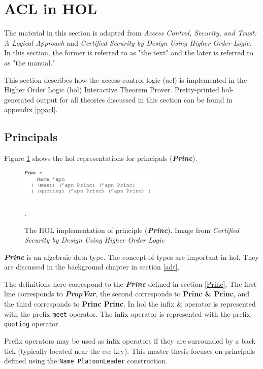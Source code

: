 \documentclass[../../main/main.tex]{subfiles}
\begin{document}
\section{ACL in HOL} \label{sec:aclinhol}
The material in this section is adapted from \textit{Access Control, Security, and Trust: A Logical Approach}\cite{ChinOlder} and \textit{Certified Security by Design Using Higher Order Logic}\cite{certmanual}. In this section, the former is referred to as "the text" and the later is referred to as "the manual."  


This section describes how the access-control logic (\gls{acl}) is implemented in the Higher Order Logic (\gls{hol}) Interactive Theorem Prover.  Pretty-printed \gls{hol}-generated output for all theories discussed in this section can be found in appendix \ref{ppacl}.  


\subsection{Principals}
Figure \ref{princHOL} shows the \gls{hol} representations for principals (\textbf{\textit{Princ}}).

\begin{figure}[h]
\centering
\includegraphics[width=0.6\textwidth]{../figures/princHOL}
\caption{\label{princHOL}The HOL implementation of principle (\textbf{\textit{Princ}}).  Image from  \textit{Certified Security by Design Using Higher Order Logic}\cite{certmanual}}.  
\end{figure}

 \textbf{\textit{Princ}} is an algebraic data type.  The concept of types are important in \gls{hol}.  They are discussed in the background chapter in section \ref{adt}. 

The definitions here correspond to the  \textbf{\textit{Princ}} defined in section \ref{Princ}.   The first line corresponds to \textbf{\textit{PropVar}}, the second corresponds to \textbf{Princ \& Princ}, and the third corresponds to \textbf{Princ \textbar  Princ}.  In \gls{hol} the infix \& operator is represented with the prefix \texttt{meet} operator.  The infix \textbar operator is represented with the prefix \texttt{quoting} operator.

%
Prefix operators may be used as infix operators if they are surrounded by a back tick \texttt{\textasciigrave} (typically located near the esc-key). This master thesis focuses on principals defined using the \texttt{Name PlatoonLeader} construction. 
\end{document}
